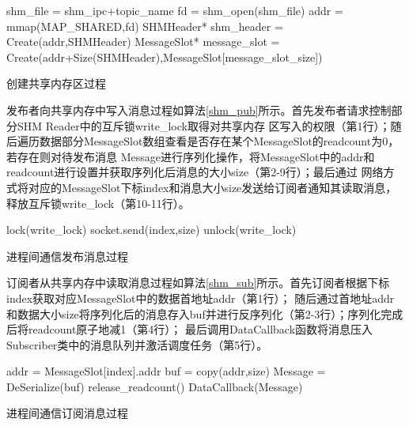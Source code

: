 \begin{algorithm}[H]
  \small
  \SetAlgoLined
  shm\_file = shm\_ipc+topic\_name\;
  fd = shm\_open(shm\_file)\;
  addr = mmap(MAP\_SHARED,fd)\;
  SHMHeader* shm\_header = Create(addr,SHMHeader)\;
  MessageSlot* message\_slot = Create(addr+Size(SHMHeader),MessageSlot[message\_slot\_size])\;
  \caption{创建共享内存区过程}
  \label{shm_create}
\end{algorithm}

发布者向共享内存中写入消息过程如算法\ref{shm_pub}所示。首先发布者请求控制部分SHM Reader中的互斥锁write\_lock取得对共享内存
区写入的权限（第1行）；随后遍历数据部分MessageSlot数组查看是否存在某个MessageSlot的readcount为0，若存在则对待发布消息
Message进行序列化操作，将MessageSlot中的addr和readcount进行设置并获取序列化后消息的大小size（第2-9行）；最后通过
网络方式将对应的MessageSlot下标index和消息大小size发送给订阅者通知其读取消息，释放互斥锁write\_lock（第10-11行）。

\begin{algorithm}
  \small
  \SetAlgoLined
  lock(write\_lock)\;
  socket.send(index,size)\;
  unlock(write\_lock)\;
  \caption{进程间通信发布消息过程}
  \label{shm_pub}
\end{algorithm}

订阅者从共享内存中读取消息过程如算法\ref{shm_sub}所示。首先订阅者根据下标index获取对应MessageSlot中的数据首地址addr（第1行）；
随后通过首地址addr和数据大小size将序列化后的消息存入buf并进行反序列化（第2-3行）；序列化完成后将readcount原子地减1（第4行）；
最后调用DataCallback函数将消息压入Subscriber类中的消息队列并激活调度任务（第5行）。

\begin{algorithm}
  \small
  \SetAlgoLined
  addr = MessageSlot[index].addr\;
  buf = copy(addr,size)\;
  Message = DeSerialize(buf)\;
  release\_readcount()\;
  DataCallback(Message)\;

  \caption{进程间通信订阅消息过程}
  \label{shm_sub}
\end{algorithm}

